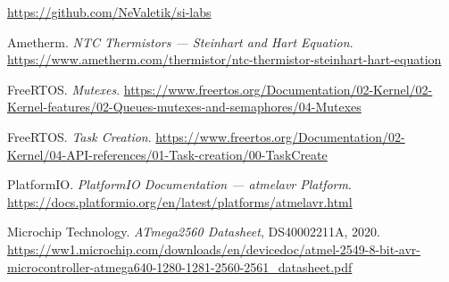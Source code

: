 \documentclass[12pt]{article}
\begin{document}
\begin{thebibliography}{}

  \url{https://github.com/NeValetik/si-labs}

  Ametherm. \textit{NTC Thermistors --- Steinhart and Hart Equation}.
  \url{https://www.ametherm.com/thermistor/ntc-thermistor-steinhart-hart-equation}

  FreeRTOS. \textit{Mutexes}.
  \url{https://www.freertos.org/Documentation/02-Kernel/02-Kernel-features/02-Queues-mutexes-and-semaphores/04-Mutexes}

  FreeRTOS. \textit{Task Creation}.
  \url{https://www.freertos.org/Documentation/02-Kernel/04-API-references/01-Task-creation/00-TaskCreate}

  PlatformIO. \textit{PlatformIO Documentation --- atmelavr Platform}.
  \url{https://docs.platformio.org/en/latest/platforms/atmelavr.html}

  Microchip Technology. \textit{ATmega2560 Datasheet}, DS40002211A, 2020.
  \url{https://ww1.microchip.com/downloads/en/devicedoc/atmel-2549-8-bit-avr-microcontroller-atmega640-1280-1281-2560-2561_datasheet.pdf}

\end{thebibliography}
\endgroup

\pagebreak
\end{document}

